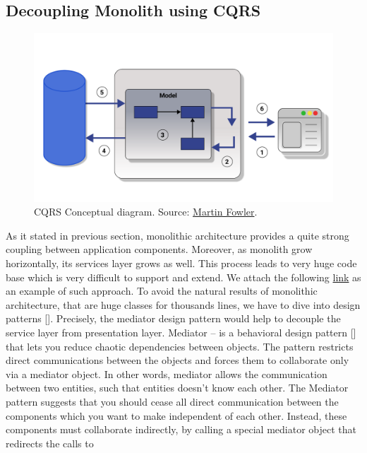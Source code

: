 \subsection{Decoupling Monolith using CQRS}\label{subsec:decoupling-monolith-using-cqrs}
\begin{figure}[H]
    \centering
    \includegraphics[width=1\textwidth]{Pictures/Services}
    \caption{CQRS Conceptual diagram.
    Source: \href{https://martinfowler.com/bliki/CQRS.html}{Martin Fowler}.}\label{fig:figure9}
\end{figure}
As it stated in previous section, monolithic architecture provides a quite strong coupling between application
components.
Moreover, as monolith grow horizontally, its services layer grows as well.
This process leads to very huge code base which is very difficult to support and extend.
We attach the following
\href{https://github.com/smartstore/SmartStoreNET/blob/4.x/src/Presentation/SmartStore.Web/Controllers/CatalogHelper.cs}
{link}
as an example of such approach.
To avoid the natural results of monolithic architecture, that are huge classes for thousands lines, we have to dive into
design patterns [\cite{rising1998design}].
Precisely, the mediator design pattern would help to decouple the service layer from presentation layer.
Mediator -- is a behavioral design pattern [\cite{rasche2016building}] that lets you reduce chaotic dependencies between objects.
The pattern restricts direct communications between the objects and forces them to collaborate only via a mediator object.
In other words, mediator allows the communication between two entities, such that entities doesn't know each other.
The Mediator pattern suggests that you should cease all direct communication between the components which you want to make
independent of each other.
Instead, these components must collaborate indirectly, by calling a special mediator object that redirects the calls to
